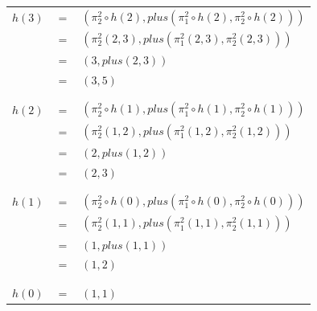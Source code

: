 \documentclass[11pt,a4paper]{article}
\begin{document}
\begin{center}
\begin{tabular}{rcl}
$h(3)$ & \hspace{-3mm}$=$\hspace{-3mm} & $(\pi_2^2 \circ h(2), plus(\pi_1^2 \circ h(2),\pi_2^2 \circ h(2)))$\\
       & \hspace{-3mm}$=$\hspace{-3mm} & $(\pi_2^2 (2, 3), plus(\pi_1^2 (2, 3),\pi_2^2 (2, 3)))$\\
       & \hspace{-3mm}$=$\hspace{-3mm} & $(3, plus(2,3))$\\
       & \hspace{-3mm}$=$\hspace{-3mm} & $(3,5)$\\
\\[-0.9em]
\hline\\[-0.75em]
$h(2)$ & \hspace{-3mm}$=$\hspace{-3mm} & $(\pi_2^2 \circ h(1), plus(\pi_1^2 \circ h(1),\pi_2^2 \circ h(1)))$\\
       & \hspace{-3mm}$=$\hspace{-3mm} & $(\pi_2^2 (1, 2), plus(\pi_1^2 (1, 2),\pi_2^2 (1, 2)))$\\
       & \hspace{-3mm}$=$\hspace{-3mm} & $(2, plus(1,2))$\\
       & \hspace{-3mm}$=$\hspace{-3mm} & $(2,3)$\\
\\[-0.9em]
\hline\\[-0.75em]
$h(1)$ & \hspace{-3mm}$=$\hspace{-3mm} & $(\pi_2^2 \circ h(0), plus(\pi_1^2 \circ h(0),\pi_2^2 \circ h(0)))$\\
       & \hspace{-3mm}$=$\hspace{-3mm} & $(\pi_2^2 (1, 1), plus(\pi_1^2 (1, 1),\pi_2^2 (1, 1)))$\\
       & \hspace{-3mm}$=$\hspace{-3mm} & $(1, plus(1,1))$\\
       & \hspace{-3mm}$=$\hspace{-3mm} & $(1,2)$\\
\\[-0.9em]
\hline\\[-0.75em]
$h(0)$ & \hspace{-3mm}$=$\hspace{-3mm} & $(1, 1)$\\
\end{tabular}
\end{center}
\end{document}
